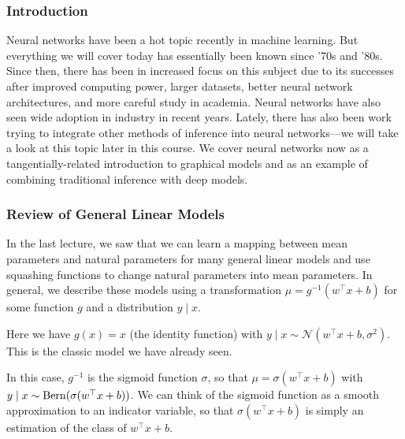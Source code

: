 \documentclass{article}
\begin{document}

\subsubsection{Introduction}

Neural networks have been a hot topic recently in machine learning. But everything we will cover today has essentially been known since '70s and '80s. Since then, there has been in increased focus on this subject due to its successes after improved computing power, larger datasets, better neural network architectures, and more careful study in academia. Neural networks have also seen wide adoption in industry in recent years. Lately, there has also been work trying to integrate other methods of inference into neural networks---we will take a look at this topic later in this course.  We cover neural networks now as a tangentially-related introduction to graphical models and as an example of combining traditional inference with deep models.

\subsubsection{Review of General Linear Models}

In the last lecture, we saw that we can learn a mapping between mean parameters and natural parameters for many general linear models and use squashing functions to change natural parameters into mean parameters.  In general, we describe these models using a transformation $\mu = g^{-1}(w^\top x+b)$ for some function $g$ and a distribution $y \mid x$.

\begin{example}
    Here we have $g(x) = x$ (the identity function) with $y \mid x \sim \mathcal{N}(w^\top x+b, \sigma^2)$.  This is the classic model we have already seen.
\end{example}

\begin{example}
    In this case, $g^{-1}$ is the sigmoid function $\sigma$, so that $\mu = \sigma(w^\top x+b)$ with $y \mid x \sim\operatorname{Bern}(\sigma(w^\top x+b))$.  We can think of the sigmoid function as a smooth approximation to an indicator variable, so that $\sigma(w^\top x+b)$ is simply an estimation of the class of $w^\top x+b$.
\end{example}
\end{document}
